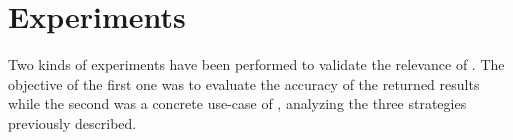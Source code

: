 \vspace*{-.1cm}
\section{Experiments}
\label{sec:experiments}
\vspace*{-.1cm}


Two kinds of experiments have been performed to validate the relevance
of \vmps. The objective of the first one was to evaluate the accuracy of the
returned results while the second was a concrete use-case of
\vmps, analyzing the three strategies previously described.



%

